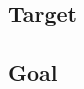 \propCSNai*

\propScenariosExist*

\propAbilityExuastive*

\propNoESUandADB*

\propNI*


\subsection*{Target}

\targetESU*

\targeGESU*

\subsection*{Goal}

\goalEAS*

\ideaEASw*




